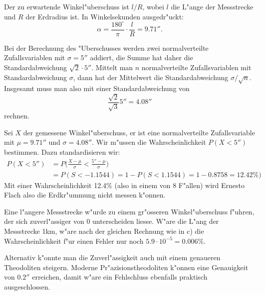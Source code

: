 \begin{loesung}
\begin{teilaufgaben}
\item
Der zu erwartende Winkel"uberschuss ist $l/R$, wobei $l$ die L"ange der
Messstrecke und $R$ der Erdradius ist.
In Winkelsekunden ausgedr"uckt: 
\[
\alpha = \frac{180^\circ}{\pi}\cdot\frac{l}{R}=9.71''.
\]
\item
Bei der Berechnung des "Uberschusses werden zwei normalverteilte
Zufallsvariablen mit $\sigma=5''$ addiert, die Summe hat daher
die Standardabweichung $\sqrt{2}\cdot 5''$.
Mittelt man $n$ normalverteilte Zufallsvariablen mit Standardabweichung
$\sigma$, dann hat der Mittelwert die Standardabweichung $\sigma/\sqrt{n}$.
Insgesamt muss man also mit einer Standardabweichung von 
\[
\frac{\sqrt{2}}{\sqrt{3}}5''= 4.08''
\]
rechnen.
\item
Sei $X$ der gemessene Winkel"uberschuss, er ist eine normalverteilte
Zufallsvariable mit $\mu=9.71''$ und $\sigma=4.08''$.
Wir m"ussen die Wahrscheinlichkeit $P(X < 5'')$ bestimmen.
Dazu standardisieren wir:
\begin{align*}
P(X<5'')
&=
P\biggl(
\frac{X-\mu}{\sigma}<\frac{5''-\mu}{\sigma}\biggr)
\\
&=P(S<-1.1544)
=1-P(S<1.1544)
=1-0.8758 = 12.42\%
\biggr)
\end{align*}
Mit einer Wahrscheinlichkeit 12.4\% (also in einem von 8 F"allen)
wird Ernesto Flach also die Erdkr"ummung nicht messen k"onnen.
\item
Eine l"angere Messstrecke w"urde zu einem gr"osseren Winkel"uberschuss
f"uhren, der sich zuverl"assiger von $0$ unterscheiden liesse.
W"are die L"ang der Messstrecke 1km, w"are nach der gleichen Rechnung
wie in c) die Wahrscheinlichkeit f"ur einen Fehler nur noch
$5.9\cdot10^{-5}=0.006\%$.

Alternativ k"onnte man die Zuverl"assigkeit auch mit einem genaueren
Theodoliten steigern.
Moderne Pr"azisionstheodoliten k"onnen eine Genauigkeit von $0.2''$
erreichen, damit w"are ein Fehlschluss ebenfalls praktisch ausgeschlossen.
\qedhere
\end{teilaufgaben}
\end{loesung}

\begin{bewertung}
\end{bewertung}



